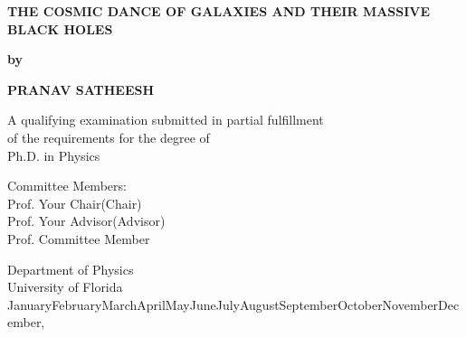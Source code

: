 \documentclass[11pt, letterpaper]{article}
\newcommand{\qetitle}{The cosmic dance of galaxies and their Massive black holes}
\newcommand{\name}{Pranav Satheesh}
\newcommand{\degreeaward}{Ph.D. in Physics}
\newcommand{\department}{Department of Physics}
\newcommand{\university}{University of Florida}
\newcommand{\monthyeardate}{\ifcase \month \or January\or February\or March\or April\or May\or June\or July\or August\or September\or October\or November\or December\fi, \number \year}
\newcommand{\chair}{Your Chair}
\newcommand{\advisor}{Your Advisor}
\newcommand{\committee}{Committee Member}
\begin{document}

\begin{titlepage}
    \begin{center}
        \vspace*{0.3in}
        \Huge{\textbf{\MakeUppercase{\qetitle}}}

        \vspace{0.35in}
        \Large{\textbf{by}}
        
        \vspace{0.45in}
        \Large{\textbf{\MakeUppercase{\name}}}
        
        \vspace{0.5in}
        \Large{A qualifying examination submitted in partial fulfillment \\
        of the requirements for the degree of \\
        \degreeaward}

        \vspace{0.8in}
        \large{Committee Members: \\
        Prof. \chair (Chair)\\
        Prof. \advisor (Advisor) \\
        Prof. \committee}

        \vspace{0.7in}
        \Large{\department \\
        \university \\
        \monthyeardate}
    \end{center}
\end{titlepage}


        
    
       
% 


\tableofcontents
\newpage

\end{document}
